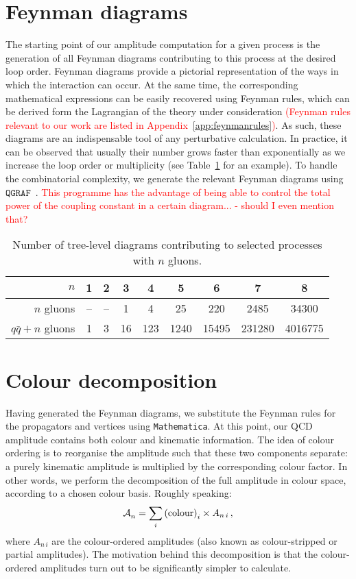 \documentclass[main.tex]{subfiles}
\begin{document}
\section{Feynman diagrams}
The starting point of our amplitude computation for a given process is the generation of all Feynman diagrams contributing to this process at the desired loop order. Feynman diagrams provide a pictorial representation of the ways in which the interaction can occur.
At the same time, the corresponding mathematical expressions can be easily recovered using Feynman rules, which can be derived form the Lagrangian of the theory under consideration \textcolor{red}{(Feynman rules relevant to our work are listed in Appendix~\ref{app:feynmanrules})}. As such, these diagrams are an indispensable tool of any perturbative calculation. In practice, it can be observed that usually their number grows faster than exponentially as we increase the loop order or multiplicity (see Table~\ref{tab:ndiags} for an example). To handle the combinatorial complexity, we generate the relevant Feynman diagrams using $\texttt{QGRAF}$~\cite{Nogueira:1991ex}. \textcolor{red}{This programme has the advantage of being able to control the total power of the coupling constant in a certain diagram... - should I even mention that?}
\begin{table}[b]
	\begin{center}
		\begin{tabular}{r|c|c|c|c|c|c|c|c}
			  $n$ & 1 & 2 & 3 & 4 & 5 & 6 & 7 & 8 \\
			\hline
			$n$ gluons   & -- & -- & 1 & 4 & 25 & 220 & 2485 & 34300 \\
			$q\bar{q} + n$ gluons & 1 & 3 & 16 & 123 & 1240 & 15495 & 231280 & 4016775 \\
		\end{tabular}
	\end{center}
 \caption{Number of tree-level diagrams contributing to selected processes with $n$ gluons.}
 \label{tab:ndiags}
\end{table}
\section{Colour decomposition}
Having generated the Feynman diagrams, we substitute the Feynman rules for the propagators and vertices using \texttt{Mathematica}. At this point, our QCD amplitude contains both colour and kinematic information. The idea of colour ordering is to reorganise the amplitude such that these two components separate: a purely kinematic amplitude is multiplied by the corresponding colour factor. In other words, we perform the decomposition of the full amplitude in colour space, according to a chosen colour basis. Roughly speaking:
\begin{equation}
    \mathcal{A}^\textbf{}_{n} = \sum_i \text{(colour)}_i \times A_{n\,i} \,, 
\end{equation}
where $A_{n\,i}$ are the colour-ordered amplitudes (also known as colour-stripped or partial amplitudes). The motivation behind this decomposition is that the colour-ordered amplitudes turn out to be significantly simpler to calculate.
\end{document}
